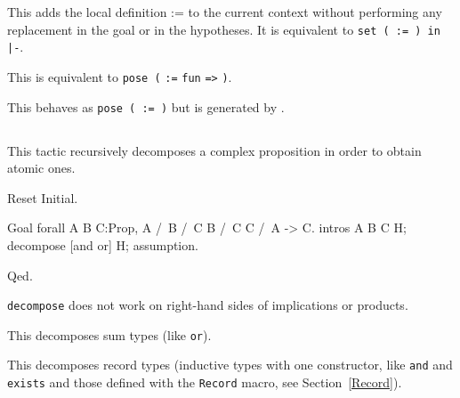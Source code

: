 \begin{Variants}
\item {}

  This adds the local definition {\ident} := {\term} to the current
  context without performing any replacement in the goal or in the
  hypotheses. It is equivalent to {\tt set ( {\ident} {\tt :=}
  {\term} {\tt ) in |-}}.

\item {}

  This is equivalent to {\tt pose (} {\ident} {\tt :=} {\tt fun}
  \nelistnosep{\binder} {\tt =>} {\term} {\tt )}.

\item{}

  This behaves as {\tt pose ( {\ident} := {\term} )} but
  {\ident} is generated by {\Coq}.

\end{Variants}

\subsection{}
\label{decompose}

This tactic recursively decomposes a
complex proposition in order to obtain atomic ones.

\Example

\begin{coq_eval}
Reset Initial.
\end{coq_eval}
\begin{coq_example}
Goal forall A B C:Prop, A /\ B /\ C \/ B /\ C \/ C /\ A -> C.
intros A B C H; decompose [and or] H; assumption.
\end{coq_example}
\begin{coq_example*}
Qed.
\end{coq_example*}

{\tt decompose} does not work on right-hand sides of implications or products.

\begin{Variants}

\item {}

  This decomposes sum types (like \texttt{or}).

\item {}

  This decomposes record types (inductive types with one constructor,
  like \texttt{and} and \texttt{exists} and those defined with the
  \texttt{Record} macro, see Section~\ref{Record}).

\end{Variants}

